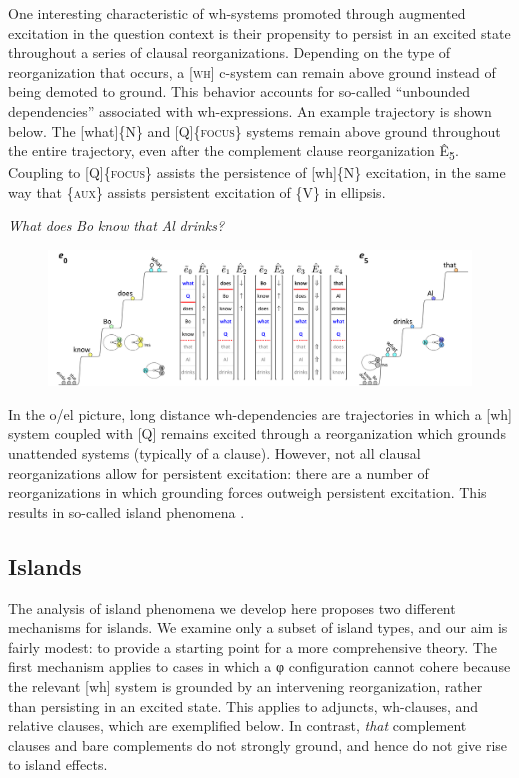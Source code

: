   One interesting characteristic of wh-systems promoted through augmented excitation in the question context is their propensity to persist in an excited state throughout a series of clausal reorganizations. Depending on the type of reorganization that occurs, a [\textsc{wh}] c-system can remain above ground instead of being demoted to ground. This behavior accounts for so-called “unbounded dependencies” associated with wh-expressions. An example trajectory is shown below. The [what]\{N\} and [Q]\{\textsc{focus}\} systems remain above ground throughout the entire trajectory, even after the complement clause reorganization Ê\textsubscript{5}. Coupling to  [Q]\{\textsc{focus}\} assists the persistence of [wh]\{N\} excitation, in the same way that \{\textsc{aux}\} assists persistent excitation of \{V\} in ellipsis. 

    \textit{What} \textit{does} \textit{Bo} \textit{know} \textit{that} \textit{Al} \textit{drinks?}

  
\begin{figure}
\includegraphics[width=\textwidth]{figures/Tilsen-img162.png}
\caption{\missingcaption}
\label{fig:}
\end{figure}
 

  In the o/el picture, long distance wh-dependencies are trajectories in which a [wh] system coupled with [Q] remains excited through a reorganization which grounds unattended systems (typically of a clause). However, not all clausal reorganizations allow for persistent excitation: there are a number of reorganizations in which grounding forces outweigh persistent excitation. This results in so-called island phenomena \citep{Ross1967}.

\subsection{Islands}

The analysis of island phenomena we develop here proposes two different mechanisms for islands. We examine only a subset of island types, and our aim is fairly modest: to provide a starting point for a more comprehensive theory. The first mechanism applies to cases in which a φ configuration cannot cohere because the relevant [wh] system is grounded by an intervening reorganization, rather than persisting in an excited state. This applies to adjuncts, wh-clauses, and relative clauses, which are exemplified below. In contrast, \textit{that} complement clauses and bare complements do not strongly ground, and hence do not give rise to island effects.

